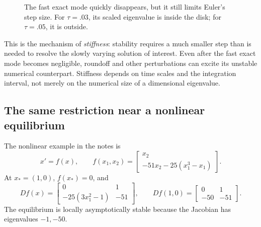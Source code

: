 \begin{figure}[htbp]
\centering
{}
\caption{The fast exact mode quickly disappears, but it still limits
Euler's step size. For \(\tau=.03\), its scaled eigenvalue is inside
the disk; for \(\tau=.05\), it is outside.}
\end{figure}

This is the mechanism of \emph{stiffness}: stability requires a much
smaller step than is needed to resolve the slowly varying solution
of interest. Even after the fast exact mode becomes negligible,
roundoff and other perturbations can excite its unstable numerical
counterpart. Stiffness depends on time scales and the integration
interval, not merely on the numerical size of a dimensional eigenvalue.

\subsection{The same restriction near a nonlinear equilibrium}

The nonlinear example in the notes is
\begin{equation}\label{eq:nonlinear-stiff-example-sep-16}
 x'=f(x),\qquad
 f(x_1,x_2)=
 \begin{bmatrix}x_2\\-51x_2-25(x_1^3-x_1)\end{bmatrix}.
\end{equation}
At \(x_*=(1,0)\), \(f(x_*)=0\), and
\[
 Df(x)=\begin{bmatrix}0&1\\-25(3x_1^2-1)&-51\end{bmatrix},
 \qquad Df(1,0)=\begin{bmatrix}0&1\\-50&-51\end{bmatrix}.
\]
The equilibrium is locally asymptotically stable because the Jacobian
has eigenvalues \(-1,-50\).

